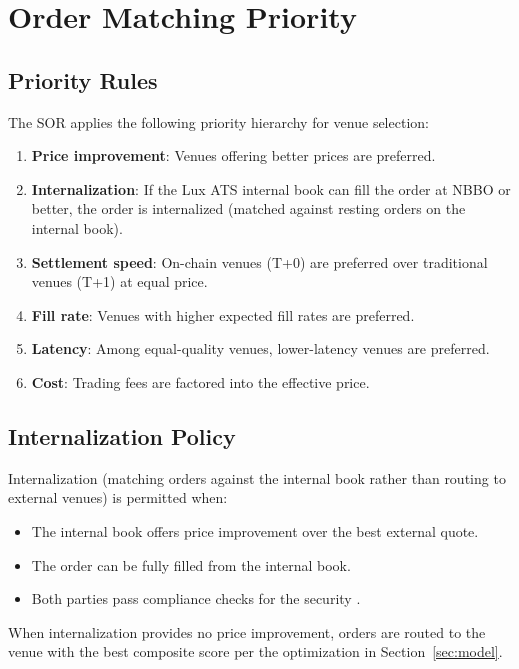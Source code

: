 \section{Order Matching Priority}
\label{sec:priority}

\subsection{Priority Rules}

The SOR applies the following priority hierarchy for venue selection:

\begin{enumerate}[nosep]
  \item \textbf{Price improvement}: Venues offering better prices are preferred.
  \item \textbf{Internalization}: If the Lux ATS internal book can fill the order at NBBO or better, the order is internalized (matched against resting orders on the internal book).
  \item \textbf{Settlement speed}: On-chain venues (T+0) are preferred over traditional venues (T+1) at equal price.
  \item \textbf{Fill rate}: Venues with higher expected fill rates are preferred.
  \item \textbf{Latency}: Among equal-quality venues, lower-latency venues are preferred.
  \item \textbf{Cost}: Trading fees are factored into the effective price.
\end{enumerate}

\subsection{Internalization Policy}

Internalization (matching orders against the internal book rather than routing to external venues) is permitted when:

\begin{itemize}[nosep]
  \item The internal book offers price improvement over the best external quote.
  \item The order can be fully filled from the internal book.
  \item Both parties pass compliance checks for the security \cite{lux-security-token-standard}.
\end{itemize}

When internalization provides no price improvement, orders are routed to the venue with the best composite score per the optimization in Section~\ref{sec:model}.

